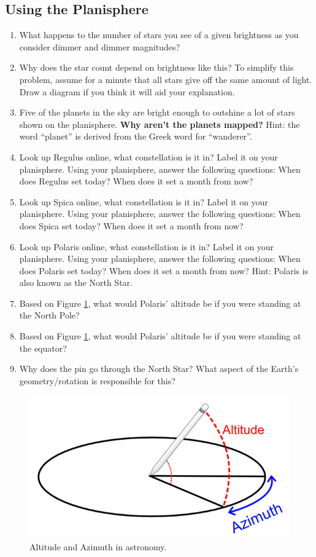 \documentclass[11pt]{article}
\begin{document}
\subsection{Using the Planisphere}
\begin{enumerate}
    \item What happens to the number of stars you see of a given brightness as you consider dimmer and dimmer magnitudes?
    \item Why does the star count depend on brightness like this? To simplify this problem, assume for a minute that all stars give off the same amount of light.  Draw a diagram if you think it will aid your explanation.
    \item Five of the planets in the sky are bright enough to outshine a lot of stars shown on the planisphere. \textbf{Why aren't the planets mapped?} Hint: the word ``planet'' is derived from the Greek word for ``wanderer''.
    \item Look up Regulus online, what constellation is it in? Label it on your planisphere. Using your planisphere, answer the following questions: When does Regulus set today? When does it set a month from now?
    \item Look up Spica online, what constellation is it in? Label it on your planisphere. Using your planisphere, answer the following questions: When does Spica set today? When does it set a month from now?
    \item Look up Polaris online, what constellation is it in? Label it on your planisphere. Using your planisphere, answer the following questions: When does Polaris set today? When does it set a month from now? Hint: Polaris is also known as the North Star.
    \item Based on Figure \ref{fig: altitude}, what would Polaris' altitude be if you were standing at the North Pole?
    \item Based on Figure \ref{fig: altitude}, what would Polaris' altitude be if you were standing at the equator?
    \item Why does the pin go through the North Star?  What aspect of the Earth's geometry/rotation is responsible for this?
\end{enumerate}


\begin{figure}[htb!] 
\center
\includegraphics[width=15cm]{Images/altitude.png}
\caption{Altitude and Azimuth in astronomy.}
\label{fig: altitude}
\end{figure}
\end{document}
